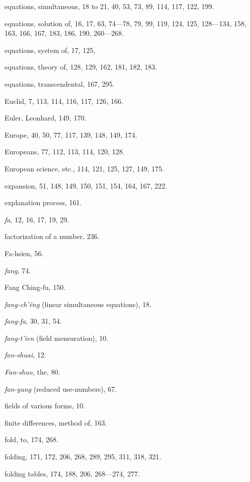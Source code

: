 \documentclass[11pt]{article}
\begin{document}
equations, simultaneous, 18 to 21, 40, 53, 73, 89, 114, 117, 122, 199.\par
equations, solution of, 16, 17, 63, 74—78, 79, 99, 119, 124, 125, 128—134, 158, 163, 166, 167, 183, 186, 190, 260—268.\par
equations, system of, 17, 125,\par
equations, theory of, 128, 129, 162, 181, 182, 183.\par
equations, transcendental, 167, 295.\par
Euclid, 7, 113, 114, 116, 117, 126, 166.\par
Euler, Leonhard, 149, 170.\par
Europe, 40, 50, 77, 117, 139, 148, 149, 174.\par
Europeans, 77, 112, 113, 114, 120, 128.\par
European science, etc., 114, 121, 125, 127, 149, 175.\par
expansion, 51, 148, 149, 150, 151, 154, 164, 167, 222.\par
explanation process, 161.\par
\medskip
\emph{fa}, 12, 16, 17, 19, 29.\par
factorization of a number, 236.\par
Fa-hsien, 56.\par
\emph{fang}, 74.\par
Fang Ching-fu, 150.\par
\emph{fang-ch'êng} (linear simultaneous equations), 18.\par
\emph{fang-fa}, 30, 31, 54.\par
\emph{fang-t'ien} (field mensuration), 10.\par
\emph{fan-shuai}, 12.\par
\emph{Fan-shuo,} the, 80.\par
\emph{fan-yung} (reduced use-numbers), 67.\par
fields of various forms, 10.\par
finite differences, method of, 163.\par
fold, to, 174, 268.\par
folding, 171, 172, 206, 268, 289, 295, 311, 318, 321.\par
folding tables, 174, 188, 206, 268—274, 277.\par
\end{document}
